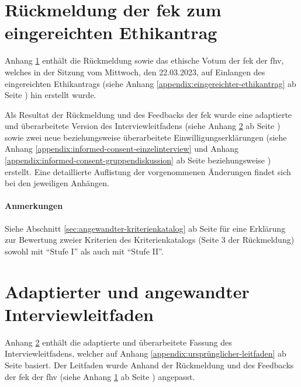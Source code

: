 \documentclass[a4paper,12pt,twoside,numbers=noendperiod]{scrreprt}
\begin{document}
\chapter{Rückmeldung der \acl{fek} zum eingereichten Ethikantrag}
\label{appendix:rückmeldung-fek}

Anhang \ref{appendix:rückmeldung-fek} enthält die Rückmeldung sowie das ethische Votum der \acl{fek} der \acl{fhv}, welches in der Sitzung vom Mittwoch, den 22.03.2023, auf Einlangen des eingereichten Ethikantrags (siehe Anhang \ref{appendix:eingereichter-ethikantrag} ab Seite \pageref{appendix:eingereichter-ethikantrag}) hin erstellt wurde.

\medskip

Als Resultat der Rückmeldung und des Feedbacks der \ac{fek} wurde eine adaptierte und überarbeitete Version des Interviewleitfadens (siehe Anhang \ref{appendix:interview-leitfaden} ab Seite \pageref{appendix:interview-leitfaden}) sowie zwei neue beziehungsweise überarbeitete Einwilligungserklärungen (siehe Anhang \ref{appendix:informed-consent-einzelinterview} und Anhang \ref{appendix:informed-consent-gruppendiskussion} ab Seite \pageref{appendix:informed-consent-einzelinterview} beziehungsweise \pageref{appendix:informed-consent-gruppendiskussion}) erstellt. Eine detaillierte Auflistung der vorgenommenen Änderungen findet sich bei den jeweiligen Anhängen.

\subsubsection*{Anmerkungen}
\label{appendix:anmerkungen-rückmeldung-fek}

Siehe Abschnitt \ref{sec:angewandter-kriterienkatalog} ab Seite \pageref{sec:angewandter-kriterienkatalog} für eine Erklärung zur Bewertung zweier Kriterien des Kriterienkatalogs (Seite 3 der Rückmeldung) sowohl mit \enquote{Stufe I} als auch mit \enquote{Stufe II}.



\cleardoublepage
\chapter{Adaptierter und angewandter Interviewleitfaden}
\label{appendix:interview-leitfaden}

Anhang \ref{appendix:interview-leitfaden} enthält die adaptierte und überarbeitete Fassung des Interviewleitfadens, welcher auf Anhang \ref{appendix:ursprünglicher-leitfaden} ab Seite \pageref{appendix:ursprünglicher-leitfaden} basiert. Der Leitfaden wurde Anhand der Rückmeldung und des Feedbacks der \acl{fek} der \acl{fhv} (siehe Anhang \ref{appendix:rückmeldung-fek} ab Seite \pageref{appendix:rückmeldung-fek}) angepasst.
\end{document}

